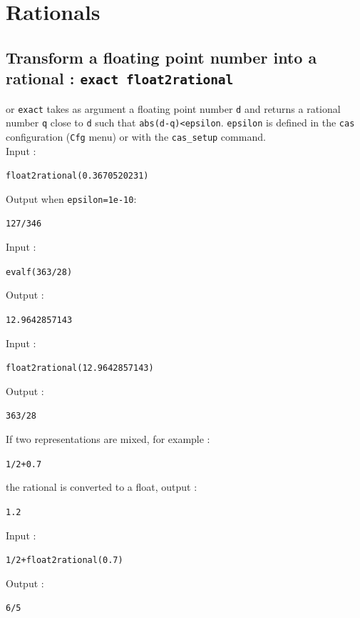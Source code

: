 \documentclass[a4paper,11pt]{book}
\begin{document}
\section{Rationals}
\subsection{Transform a floating point number into a rational : {\tt exact 
float2rational}}
  or {\tt exact} takes as argument a  
floating point number {\tt d} and returns 
a rational number {\tt q} close to 
{\tt d} such that {\tt abs(d-q)<epsilon}. 
{\tt epsilon} is defined in the {\tt cas} configuration
({\tt Cfg} menu) or with the {\tt cas\_setup} command.\\
Input :
\begin{center}{\tt float2rational(0.3670520231)}\end{center}
Output when {\tt epsilon=1e-10}:
\begin{center}{\tt 127/346}\end{center}
Input :
\begin{center}{\tt evalf(363/28)}\end{center}
Output :
\begin{center}{\tt 12.9642857143}\end{center}
Input :
\begin{center}{\tt float2rational(12.9642857143)}\end{center}
Output :
\begin{center}{\tt 363/28}\end{center}
If two representations are mixed, for example :
\begin{center}{\tt 1/2+0.7}\end{center}
the rational is converted to a float, output :
\begin{center}{\tt 1.2}\end{center} 
Input :
\begin{center}{\tt 1/2+float2rational(0.7)}\end{center}
Output :
\begin{center}{\tt 6/5}\end{center}
\end{document}
